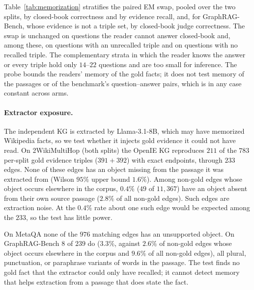 \documentclass[11pt]{article}
\begin{document}
Table~\ref{tab:memorization} stratifies the paired EM swap, pooled over the two splits, by closed-book correctness and by evidence recall, and, for GraphRAG-Bench, whose evidence is not a triple set, by closed-book judge correctness. The swap is unchanged on questions the reader cannot answer closed-book and, among these, on questions with an unrecalled triple and on questions with no recalled triple. The complementary strata in which the reader knows the answer or every triple hold only $14$--$22$ questions and are too small for inference. The probe bounds the readers' memory of the gold facts; it does not test memory of the passages or of the benchmark's question--answer pairs, which is in any case constant across arms.

\begin{table}[ht]\centering\footnotesize
\setlength{\tabcolsep}{3pt}
\resizebox{\columnwidth}{!}{}
\caption{Answer-level swap by training-exposure stratum, both splits pooled: $n$ questions and mean paired EM (judge accuracy on GraphRAG-Bench) difference, aligned minus independent KG; exact sign test, $^{*}p<0.05$, $^{**}p<0.01$. ``c.b.'' is closed-book.}
\label{tab:memorization}
\end{table}

\paragraph{Extractor exposure.} The independent KG is extracted by Llama-3.1-8B, which may have memorized Wikipedia facts, so we test whether it injects gold evidence it could not have read. On 2WikiMultiHop (both splits) the OpenIE KG reproduces $211$ of the $783$ per-split gold evidence triples ($391+392$) with exact endpoints, through $233$ edges. None of these edges has an object missing from the passage it was extracted from (Wilson $95\%$ upper bound $1.6\%$). Among non-gold edges whose object occurs elsewhere in the corpus, $0.4\%$ ($49$ of $11{,}367$) have an object absent from their own source passage ($2.8\%$ of all non-gold edges). Such edges are extraction noise. At the $0.4\%$ rate about one such edge would be expected among the $233$, so the test has little power.

On MetaQA none of the $976$ matching edges has an unsupported object. On GraphRAG-Bench $8$ of $239$ do ($3.3\%$, against $2.6\%$ of non-gold edges whose object occurs elsewhere in the corpus and $9.6\%$ of all non-gold edges), all plural, punctuation, or paraphrase variants of words in the passage. The test finds no gold fact that the extractor could only have recalled; it cannot detect memory that helps extraction from a passage that does state the fact.
\end{document}
